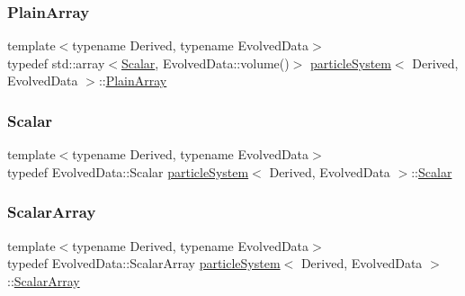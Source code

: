 \mbox{\label{classparticle_system_ae5a7215810a9f2cad5508aca6b26a063}} 
\subsubsection{\texorpdfstring{Plain\+Array}{PlainArray}}
{\footnotesize\ttfamily template$<$typename Derived, typename Evolved\+Data$>$ \\
typedef std\+::array$<$\mbox{\hyperlink{classparticle_system_a28e49da72c0ca5786d0611e6128a8994}{Scalar}}, Evolved\+Data\+::volume()$>$ \mbox{\hyperlink{classparticle_system}{particle\+System}}$<$ Derived, Evolved\+Data $>$\+::\mbox{\hyperlink{classparticle_system_ae5a7215810a9f2cad5508aca6b26a063}{Plain\+Array}}}

\mbox{\label{classparticle_system_a28e49da72c0ca5786d0611e6128a8994}} 
\subsubsection{\texorpdfstring{Scalar}{Scalar}}
{\footnotesize\ttfamily template$<$typename Derived, typename Evolved\+Data$>$ \\
typedef Evolved\+Data\+::\+Scalar \mbox{\hyperlink{classparticle_system}{particle\+System}}$<$ Derived, Evolved\+Data $>$\+::\mbox{\hyperlink{classparticle_system_a28e49da72c0ca5786d0611e6128a8994}{Scalar}}}

\mbox{\label{classparticle_system_af7f328120ff85c8b34edeed4a68b746e}} 
\subsubsection{\texorpdfstring{Scalar\+Array}{ScalarArray}}
{\footnotesize\ttfamily template$<$typename Derived, typename Evolved\+Data$>$ \\
typedef Evolved\+Data\+::\+Scalar\+Array \mbox{\hyperlink{classparticle_system}{particle\+System}}$<$ Derived, Evolved\+Data $>$\+::\mbox{\hyperlink{classparticle_system_af7f328120ff85c8b34edeed4a68b746e}{Scalar\+Array}}}

